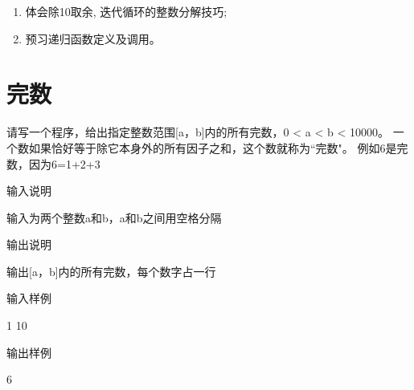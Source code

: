 \begin{note}[知识点]
	\begin{enumerate}
		\item 体会除10取余, 迭代循环的整数分解技巧;
		\item 预习递归函数定义及调用。
	\end{enumerate}
\end{note}

\section{完数}
请写一个程序，给出指定整数范围[a，b]内的所有完数，0 < a < b < 10000。
一个数如果恰好等于除它本身外的所有因子之和，这个数就称为``完数"。
例如6是完数，因为6=1+2+3

输入说明	

输入为两个整数a和b，a和b之间用空格分隔

输出说明	

输出[a，b]内的所有完数，每个数字占一行

输入样例	

1 10

输出样例	

6

